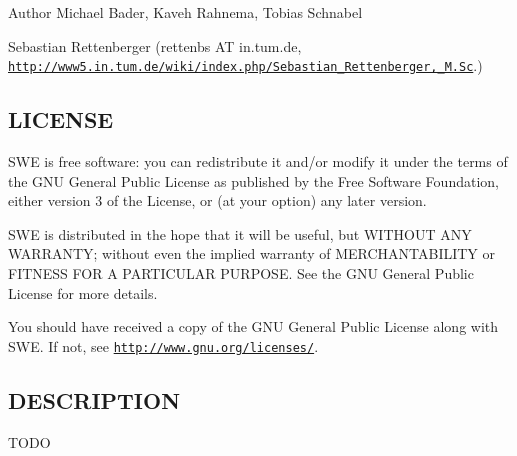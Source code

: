 \begin{DoxyAuthor}{Author}
Michael Bader, Kaveh Rahnema, Tobias Schnabel 

Sebastian Rettenberger (rettenbs AT in.\+tum.\+de, \href{http://www5.in.tum.de/wiki/index.php/Sebastian_Rettenberger,_M.Sc}{\tt http\+://www5.\+in.\+tum.\+de/wiki/index.\+php/\+Sebastian\+\_\+\+Rettenberger,\+\_\+\+M.\+Sc}.)
\end{DoxyAuthor}
\hypertarget{help_8hh_LICENSE}{}\subsection{L\+I\+C\+E\+N\+SE}\label{help_8hh_LICENSE}
S\+WE is free software\+: you can redistribute it and/or modify it under the terms of the G\+NU General Public License as published by the Free Software Foundation, either version 3 of the License, or (at your option) any later version.

S\+WE is distributed in the hope that it will be useful, but W\+I\+T\+H\+O\+UT A\+NY W\+A\+R\+R\+A\+N\+TY; without even the implied warranty of M\+E\+R\+C\+H\+A\+N\+T\+A\+B\+I\+L\+I\+TY or F\+I\+T\+N\+E\+SS F\+OR A P\+A\+R\+T\+I\+C\+U\+L\+AR P\+U\+R\+P\+O\+SE. See the G\+NU General Public License for more details.

You should have received a copy of the G\+NU General Public License along with S\+WE. If not, see \href{http://www.gnu.org/licenses/}{\tt http\+://www.\+gnu.\+org/licenses/}.\hypertarget{help_8hh_DESCRIPTION}{}\subsection{D\+E\+S\+C\+R\+I\+P\+T\+I\+ON}\label{help_8hh_DESCRIPTION}
T\+O\+DO 